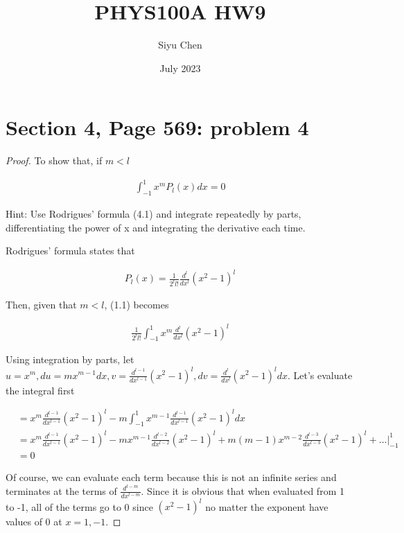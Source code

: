 \documentclass{article}
\title{PHYS100A HW9}
\author{Siyu Chen}
\date{July 2023}
\numberwithin{equation}{section}
\begin{document}
\maketitle

\section{Section 4, Page 569: problem 4}

\begin{proof}
To show that, if $m<l$

\begin{align}
    \int_{-1}^{1} x^m P_l(x) dx = 0
\end{align}

Hint: Use Rodrigues’ formula (4.1) and integrate repeatedly by parts, differentiating the power of x and integrating the derivative each time.


Rodrigues' formula states that 

\begin{align}
    P_l (x) = \frac{1}{2^l l!} \frac{d^l}{dx^l} (x^2 - 1)^l
\end{align}

Then, given that $m<l$, (1.1) becomes

\begin{align}
    \frac{1}{2^l l!} \int_{-1}^{1} x^m \frac{d^l}{dx^l} (x^2 - 1)^l
\end{align}

Using integration by parts, let $u = x^m, du = m x^{m-1} dx, v = \frac{d^{l-1}}{dx^{l-1}}(x^2-1)^l, dv = \frac{d^l}{dx^l} (x^2 - 1)^l dx$. Let's evaluate the integral first

\begin{align}
    &= x^m  \frac{d^{l-1}}{dx^{l-1}}(x^2-1)^l - m\int_{-1}^{1} x^{m-1}\frac{d^{l-1}}{dx^{l-1}}(x^2-1)^l  dx \\
    &= x^m \frac{d^{l-1}}{dx^{l-1}}(x^2-1)^l - m x^{m-1} \frac{d^{l-2}}{dx^{l-2}} (x^2-1)^l + m(m-1) x^{m-2} \frac{d^{l-3}}{dx^{l-3}} (x^2-1)^l + \ldots \vert^{1}_{-1} \\
    & = 0
\end{align}

Of course, we can evaluate each term because this is not an infinite series and terminates at the terms of $\frac{d^{l-m}}{dx^{l-m}}$. Since it is obvious that when evaluated from 1 to -1, all of the terms go to 0 since $(x^2-1)^l$ no matter the exponent have values of 0 at $x = 1, -1$. 


\end{proof}
\end{document}
